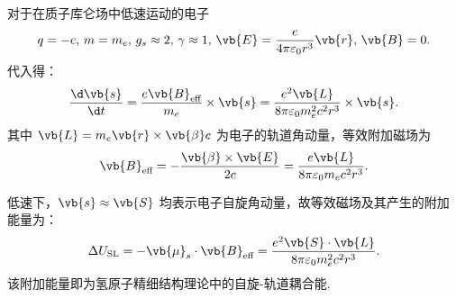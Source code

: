 \begin{example}
	对于在质子库仑场中低速运动的电子
	\begin{equation*}
		q=-e,\,m=m_e,\,g_s\approx 2,\,\gamma \approx 1,\,\vb{E} = \dfrac{e}{4\pi\varepsilon_0 r^3}\vb{r},\,\vb{B} = 0.
	\end{equation*}
	代入得：
	\begin{equation*}
		\dfrac{\d \vb{s}}{\d t} = \dfrac{e \vb{B}_\text{eff}}{m_e} \times \vb{s} = \dfrac{e^2 \vb{L}}{8\pi\varepsilon_0 m_e^2 c^2 r^3} \times \vb{s}.
	\end{equation*}
	其中 \(\vb{L} = m_e \vb{r} \times \vb{\beta} c\) 为电子的轨道角动量，等效附加磁场为
	\begin{equation*}
		\vb{B}_\text{eff} = -\dfrac{\vb{\beta} \times \vb{E}}{2c} = \dfrac{e \vb{L}}{8\pi\varepsilon_0 m_e c^2 r^3}.
	\end{equation*}

	低速下，\(\vb{s} \approx \vb{S}\) 均表示电子自旋角动量，故等效磁场及其产生的附加能量为：
	\begin{equation*}
		\Delta U_{\text{SL}} = -\vb{\mu}_s \cdot \vb{B}_\text{eff} = \dfrac{e^2 \vb{S} \cdot \vb{L}}{8\pi\varepsilon_0 m_e^2 c^2 r^3}.
	\end{equation*}
	该附加能量即为氢原子精细结构理论中的自旋-轨道耦合能.
\end{example}
